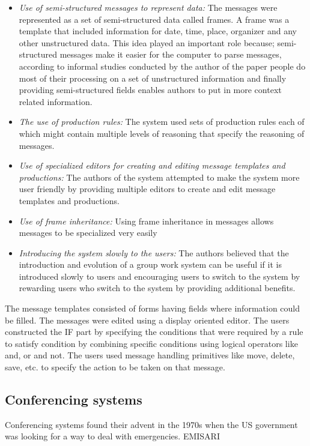 \begin{itemize} 
  \item \emph{ Use of semi-structured messages to represent data:} The messages were represented as a set of semi-structured data
  called frames. A frame was a template that included information for
  date, time, place, organizer and any other unstructured data. This
  idea played an important role because; semi-structured messages make
  it easier for the computer to parse messages, according to informal
  studies conducted by the author of the paper\cite{Malo87a} people do
  most of their processing on a set of unstructured information and
  finally providing semi-structured fields enables authors to put in
  more context related information.

\item \emph{The use of production rules:} The system used sets of
  production rules each of which might contain multiple levels of
  reasoning that specify the reasoning of messages.

\item \emph{Use of specialized editors for creating and editing
    message templates and productions: } The authors of the system
  attempted to make the system more user friendly by providing
  multiple editors to create and edit message templates and
  productions.
\item \emph{Use of frame inheritance:} Using frame inheritance in
  messages allows messages to be specialized very easily
\item \emph{Introducing the system slowly to the users:} The authors
  believed that the introduction and evolution of a group work system
  can be useful if it is introduced slowly to users and encouraging
  users to switch to the system by rewarding users who switch to the
  system by providing additional benefits.
\end{itemize}

The message templates consisted of forms having fields where
information could be filled. The messages were edited using a display
oriented editor. The users constructed the IF part by specifying the
conditions that were required by a rule to satisfy condition by
combining specific conditions using logical operators like and, or and
not. The users used message handling primitives like move, delete,
save, etc. to specify the action to be taken on that message.

\subsection{Conferencing systems}
Conferencing systems found their advent in the 1970s when the US
government was looking for a way to deal with emergencies. EMISARI\cite{Hilt78a}

